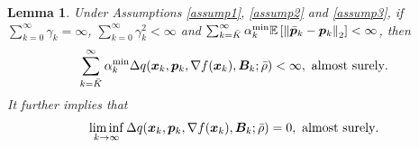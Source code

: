\documentclass[aos]{imsart}
\numberwithin{equation}{section}
\theoremstyle{plain}
\newtheorem{lemma}{Lemma}
\begin{document}
\begin{appendix}
\begin{lemma}
\label{lemma24}
    Under Assumptions \ref{assump1}, \ref{assump2} and \ref{assump3}, if $\sum_{k=0}^{\infty} \gamma_k = \infty$, $\sum_{k=0}^{\infty} \gamma_k^2 < \infty$ and $\sum_{k=\Bar{K}}^{\infty} \alpha_k^{\text{min}} \mathbb{E} \left[\left\|\Bar{\bm{p}}_k - \bm{p}_k \right\|_2\right] < \infty$, then 
        \begin{equation}
        \label{eq25}
        \sum_{k=\Bar{K}}^{\infty}  \alpha_k^{\text{min}} \Delta q(\bm{x}_k,\bm{p}_k,\nabla f(\bm{x}_k),\bm{B}_k;\Bar{\rho}) < \infty,~\text{almost surely}.
    \end{equation}
    It further implies that 
    \begin{equation}
    \label{eq26}
        \mathop{\lim \inf}_{k \to \infty} \Delta q(\bm{x}_k,\bm{p}_k,\nabla f(\bm{x}_k),\bm{B}_k;\Bar{\rho}) = 0,~\text{almost surely}.
    \end{equation}
\end{lemma}



\end{appendix}
\end{document}
